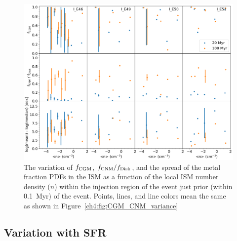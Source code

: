  \begin{figure}
   \centering
   \includegraphics[angle=90,width=0.9\linewidth]{figures/ch4/II_n_dependence}
   \caption{The variation of $f_{\rm CGM}$, $f_{\rm CNM} / f_{\rm Disk}$, and the spread of the metal fraction PDFs in the ISM as a function of the local ISM number density ($n$) within the injection region of the event just prior (within 0.1~Myr) of the event. Points, lines, and line colors mean the same as shown in Figure~\ref{ch4:fig:CGM_CNM_variance}}
   \label{ch4:fig:ISM_variance}
 \end{figure}


\subsection{Variation with SFR}
\label{ch4:sec:SFR}

